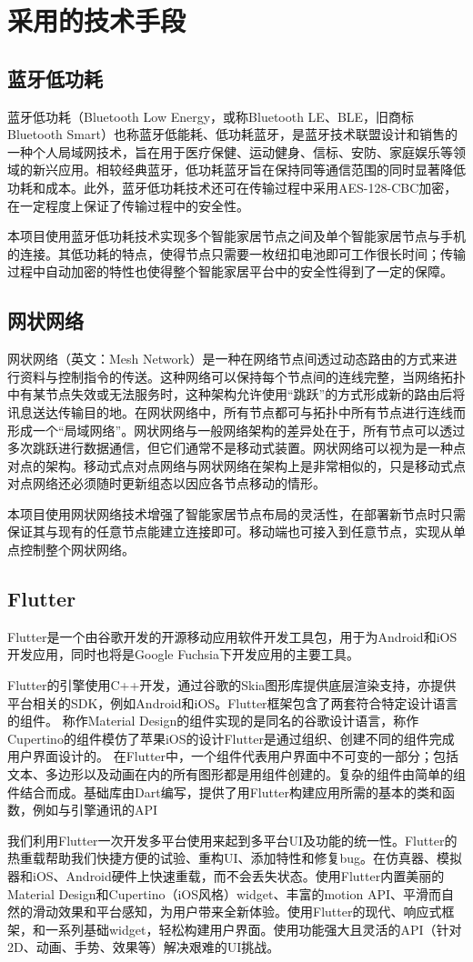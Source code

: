 \chapter{采用的技术手段}

\section{蓝牙低功耗}
蓝牙低功耗（Bluetooth Low Energy，或称Bluetooth LE、BLE，旧商标Bluetooth Smart）也称蓝牙低能耗、低功耗蓝牙，是蓝牙技术联盟设计和销售的一种个人局域网技术，旨在用于医疗保健、运动健身、信标、安防、家庭娱乐等领域的新兴应用。相较经典蓝牙，低功耗蓝牙旨在保持同等通信范围的同时显著降低功耗和成本。\cite{ble}此外，蓝牙低功耗技术还可在传输过程中采用AES-128-CBC加密，在一定程度上保证了传输过程中的安全性。

本项目使用蓝牙低功耗技术实现多个智能家居节点之间及单个智能家居节点与手机的连接。其低功耗的特点，使得节点只需要一枚纽扣电池即可工作很长时间；传输过程中自动加密的特性也使得整个智能家居平台中的安全性得到了一定的保障。

\section{网状网络}
网状网络（英文：Mesh Network）是一种在网络节点间透过动态路由的方式来进行资料与控制指令的传送。这种网络可以保持每个节点间的连线完整，当网络拓扑中有某节点失效或无法服务时，这种架构允许使用“跳跃”的方式形成新的路由后将讯息送达传输目的地。在网状网络中，所有节点都可与拓扑中所有节点进行连线而形成一个“局域网络”。网状网络与一般网络架构的差异处在于，所有节点可以透过多次跳跃进行数据通信，但它们通常不是移动式装置。网状网络可以视为是一种点对点的架构。移动式点对点网络与网状网络在架构上是非常相似的，只是移动式点对点网络还必须随时更新组态以因应各节点移动的情形。\cite{mesh}

本项目使用网状网络技术增强了智能家居节点布局的灵活性，在部署新节点时只需保证其与现有的任意节点能建立连接即可。移动端也可接入到任意节点，实现从单点控制整个网状网络。

\section{Flutter}
Flutter是一个由谷歌开发的开源移动应用软件开发工具包，用于为Android和iOS开发应用，同时也将是Google Fuchsia下开发应用的主要工具。

Flutter的引擎使用C++开发，通过谷歌的Skia图形库提供底层渲染支持，亦提供平台相关的SDK，例如Android和iOS。Flutter框架包含了两套符合特定设计语言的组件。 称作Material Design的组件实现的是同名的谷歌设计语言，称作Cupertino的组件模仿了苹果iOS的设计Flutter是通过组织、创建不同的组件完成用户界面设计的。 在Flutter中，一个组件代表用户界面中不可变的一部分；包括文本、多边形以及动画在内的所有图形都是用组件创建的。复杂的组件由简单的组件结合而成。基础库由Dart编写，提供了用Flutter构建应用所需的基本的类和函数，例如与引擎通讯的API

我们利用Flutter一次开发多平台使用来起到多平台UI及功能的统一性。Flutter的热重载帮助我们快捷方便的试验、重构UI、添加特性和修复bug。在仿真器、模拟器和iOS、Android硬件上快速重载，而不会丢失状态。使用Flutter内置美丽的Material Design和Cupertino（iOS风格）widget、丰富的motion API、平滑而自然的滑动效果和平台感知，为用户带来全新体验。使用Flutter的现代、响应式框架，和一系列基础widget，轻松构建用户界面。使用功能强大且灵活的API（针对2D、动画、手势、效果等）解决艰难的UI挑战。
